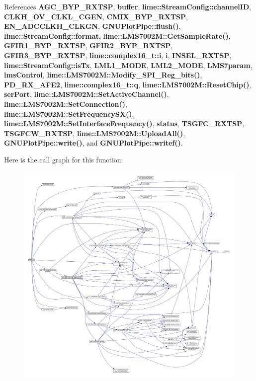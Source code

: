 References {\bf A\+G\+C\+\_\+\+B\+Y\+P\+\_\+\+R\+X\+T\+SP}, {\bf buffer}, {\bf lime\+::\+Stream\+Config\+::channel\+ID}, {\bf C\+L\+K\+H\+\_\+\+O\+V\+\_\+\+C\+L\+K\+L\+\_\+\+C\+G\+EN}, {\bf C\+M\+I\+X\+\_\+\+B\+Y\+P\+\_\+\+R\+X\+T\+SP}, {\bf E\+N\+\_\+\+A\+D\+C\+C\+L\+K\+H\+\_\+\+C\+L\+K\+GN}, {\bf G\+N\+U\+Plot\+Pipe\+::flush()}, {\bf lime\+::\+Stream\+Config\+::format}, {\bf lime\+::\+L\+M\+S7002\+M\+::\+Get\+Sample\+Rate()}, {\bf G\+F\+I\+R1\+\_\+\+B\+Y\+P\+\_\+\+R\+X\+T\+SP}, {\bf G\+F\+I\+R2\+\_\+\+B\+Y\+P\+\_\+\+R\+X\+T\+SP}, {\bf G\+F\+I\+R3\+\_\+\+B\+Y\+P\+\_\+\+R\+X\+T\+SP}, {\bf lime\+::complex16\+\_\+t\+::i}, {\bf i}, {\bf I\+N\+S\+E\+L\+\_\+\+R\+X\+T\+SP}, {\bf lime\+::\+Stream\+Config\+::is\+Tx}, {\bf L\+M\+L1\+\_\+\+M\+O\+DE}, {\bf L\+M\+L2\+\_\+\+M\+O\+DE}, {\bf L\+M\+S7param}, {\bf lms\+Control}, {\bf lime\+::\+L\+M\+S7002\+M\+::\+Modify\+\_\+\+S\+P\+I\+\_\+\+Reg\+\_\+bits()}, {\bf P\+D\+\_\+\+R\+X\+\_\+\+A\+F\+E2}, {\bf lime\+::complex16\+\_\+t\+::q}, {\bf lime\+::\+L\+M\+S7002\+M\+::\+Reset\+Chip()}, {\bf ser\+Port}, {\bf lime\+::\+L\+M\+S7002\+M\+::\+Set\+Active\+Channel()}, {\bf lime\+::\+L\+M\+S7002\+M\+::\+Set\+Connection()}, {\bf lime\+::\+L\+M\+S7002\+M\+::\+Set\+Frequency\+S\+X()}, {\bf lime\+::\+L\+M\+S7002\+M\+::\+Set\+Interface\+Frequency()}, {\bf status}, {\bf T\+S\+G\+F\+C\+\_\+\+R\+X\+T\+SP}, {\bf T\+S\+G\+F\+C\+W\+\_\+\+R\+X\+T\+SP}, {\bf lime\+::\+L\+M\+S7002\+M\+::\+Upload\+All()}, {\bf G\+N\+U\+Plot\+Pipe\+::write()}, and {\bf G\+N\+U\+Plot\+Pipe\+::writef()}.



Here is the call graph for this function\+:
\nopagebreak
\begin{figure}[H]
\begin{center}
\leavevmode
\includegraphics[width=350pt]{df/d7d/streaming_8cpp_a7d759c801e29f1c581b6bfd08802f6b2_cgraph}
\end{center}
\end{figure}


